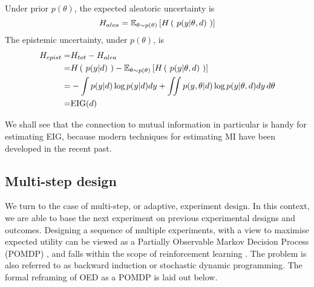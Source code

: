 \begin{enumerate}
Under prior $p(\theta)$, the expected aleatoric uncertainty is
\begin{equation}
	H_{alea} = \mathbb{E}_{\theta \sim p(\theta)}\left[ H\left(\ p(y|\theta, d)\ \right) \right]
\end{equation}
The epistemic uncertainty, under $p(\theta)$, is
\begin{align}
	H_{epist} =& H_{tot} - H_{alea}\\
	=&H\left(\ p(y|d)\ \right) - \mathbb{E}_{\theta \sim p(\theta)}\left[ H\left(\ p(y|\theta, d)\ \right) \right] \\
	=&-\int p(y|d)\log p(y|d)dy + \iint p(y, \theta | d)\log p(y|\theta, d) dy \, d\theta\\
	=& \text{EIG}(d)
\end{align}

\end{enumerate}
We shall see that the connection to mutual information in particular is handy for estimating EIG, because modern techniques for estimating MI have been developed in the recent past.


\subsection{Multi-step design}
We turn to the case of multi-step, or adaptive, experiment design. In this context, we are able to base the next experiment on previous experimental designs and outcomes. Designing a sequence of multiple experiments, with a view to maximise expected utility can be viewed as a Partially Observable Markov Decision Process (POMDP) \cite{marchant2014}, and falls within the scope of reinforcement learning \cite{pang2018}. The problem is also referred to as backward induction or stochastic dynamic programming. The formal reframing of OED as a POMDP is laid out below.

